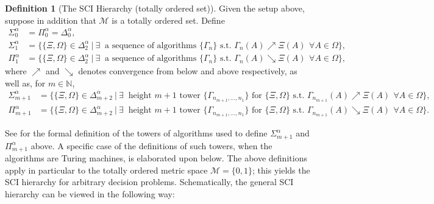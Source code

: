 \documentclass[10pt, a4paper, reqno]{amsart}
\numberwithin{equation}{section}
\theoremstyle{definition}
\newtheorem{definition}[theorem]{Definition}
\theoremstyle{definition}
\begin{document}
\begin{definition}[The SCI Hierarchy (totally ordered set)]\label{def:tot_ord}
Given the setup above, suppose in addition that $\mathcal{M}$ is a totally ordered set. 
Define 
\begin{equation*}
\begin{split}
\Sigma^{\alpha}_0 &= \Pi^{\alpha}_0 = \Delta^{\alpha}_0,\\
\Sigma^{\alpha}_{1} &= \{\{\Xi,\Omega\} \in \Delta_{2}^{\alpha} \ \vert \  \exists \ \textrm{ a sequence of algorithms } \{\Gamma_{n}\} \text{ s.t. } \Gamma_{n}(A) \nearrow \Xi(A) \ \, \forall A \in \Omega\}, 
\\
\Pi^{\alpha}_{1} &= \{\{\Xi,\Omega\} \in \Delta_{2}^{\alpha} \ \vert \  \exists \ \textrm{ a sequence of algorithms } \{\Gamma_{n}\} \text{ s.t. } \Gamma_{n}(A) \searrow \Xi(A) \ \, \forall A \in \Omega\},
\end{split}
\end{equation*}
where $\nearrow$ and $\searrow$ denotes convergence from below and above respectively, as well as, for $m \in \mathbb{N}$, 
\begin{equation*}
\begin{split}
\Sigma^{\alpha}_{m+1} &= \{\{\Xi,\Omega\} \in \Delta_{m+2}^{\alpha} \ \vert \  \exists \ \textrm{ height } m +1 \textrm{ tower } \{\Gamma_{n_{m+1}, \hdots, n_1}\} \textrm{ for } \{ \Xi, \Omega \} \text{ s.t. }\Gamma_{n_{m+1}}(A) \nearrow \Xi(A) \ \, \forall A \in \Omega\}, \\
\Pi^{\alpha}_{m+1} &= \{\{\Xi,\Omega\} \in \Delta_{m+2}^{\alpha} \ \vert \  \exists \ \textrm{ height } m +1 \textrm{ tower } \{\Gamma_{n_{m+1}, \hdots, n_1}\} \textrm{ for } \{ \Xi, \Omega \} \text{ s.t. }\Gamma_{n_{m+1}}(A) \searrow \Xi(A) \ \, \forall A \in \Omega\}.
\end{split}
\end{equation*}
\end{definition}
See \cite{SCI} for the formal definition of the towers of algorithms used to define $\Sigma_{m+1}^{\alpha}$ and $\Pi_{m+1}^{\alpha}$ above. A specific case of the definitions of such towers, when the algorithms are Turing machines, is elaborated upon below.
The above definitions apply in particular to the totally ordered metric space $\mathcal{M} = \{0,1\}$; this yields the SCI hierarchy for arbitrary decision problems. 
Schematically, the general SCI hierarchy can be viewed in the following way:
\end{document}
